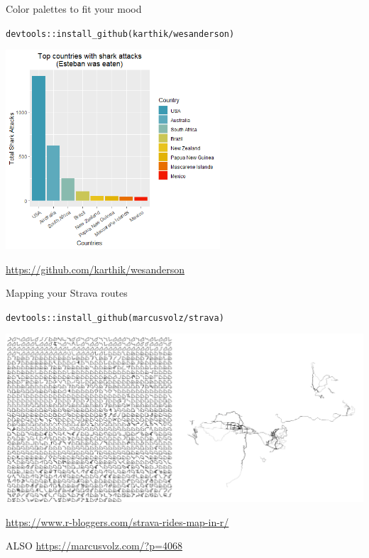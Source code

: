 \documentclass[
  ignorenonframetext,
]{beamer}
\begin{document}
\begin{frame}[fragile]{Color palettes to fit your mood}
\protect\hypertarget{color-palettes-to-fit-your-mood}{}

\texttt{devtools::install\_github(karthik/wesanderson)}

\includegraphics[width=0.6\textwidth,height=\textheight]{../external/images/funR_3_wes_anderson.png}

\url{https://github.com/karthik/wesanderson}

\end{frame}

\begin{frame}[fragile]{Mapping your Strava routes}
\protect\hypertarget{mapping-your-strava-routes}{}

\texttt{devtools::install\_github(marcusvolz/strava)}

\includegraphics{../external/images/funR_4_strava_combo.png}

\url{https://www.r-bloggers.com/strava-rides-map-in-r/}

ALSO \url{https://marcusvolz.com/?p=4068}

\end{frame}
\end{document}
